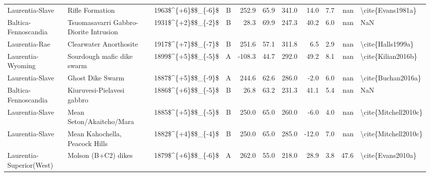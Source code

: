 \begin{longtable}{p{1 in}p{1 in}rrrrrrrr}
               Laurentia-Slave &                                    Rifle Formation &     1963\$\textasciicircum \{+6\}\$\$\_\{-6\}\$ &      B &     252.9 &      65.9 & 341.0 &  14.0 &       7.7 &         nan &                                  \textbackslash cite\{Evans1981a\} \\
          Baltica-Fennoscandia &             Tsuomasavarri Gabbro-Diorite Intrusion &     1931\$\textasciicircum \{+2\}\$\$\_\{-2\}\$ &      B &      28.3 &      69.9 & 247.3 &  40.2 &       6.0 &         nan &                                                NaN \\
                 Laurentia-Rae &                             Clearwater Anorthosite &     1917\$\textasciicircum \{+7\}\$\$\_\{-7\}\$ &      B &     251.6 &      57.1 & 311.8 &   6.5 &       2.9 &         nan &                                  \textbackslash cite\{Halls1999a\} \\
             Laurentia-Wyoming &                         Sourdough mafic dike swarm &     1899\$\textasciicircum \{+5\}\$\$\_\{-5\}\$ &      A &    -108.3 &      44.7 & 292.0 &  49.2 &       8.1 &         nan &                                 \textbackslash cite\{Kilian2016b\} \\
               Laurentia-Slave &                                   Ghost Dike Swarm &     1887\$\textasciicircum \{+5\}\$\$\_\{-9\}\$ &      A &     244.6 &      62.6 & 286.0 &  -2.0 &       6.0 &         nan &                                 \textbackslash cite\{Buchan2016a\} \\
          Baltica-Fennoscandia &                         Kiuruvesi-Pielavesi gabbro &     1886\$\textasciicircum \{+6\}\$\$\_\{-5\}\$ &      B &      26.8 &      63.2 & 231.3 &  41.1 &       5.4 &         nan &                                                NaN \\
               Laurentia-Slave &                           Mean Seton/Akaitcho/Mara &     1885\$\textasciicircum \{+5\}\$\$\_\{-5\}\$ &      B &     250.0 &      65.0 & 260.0 &  -6.0 &       4.0 &         nan &                               \textbackslash cite\{Mitchell2010c\} \\
               Laurentia-Slave &                     Mean Kahochella, Peacock Hills &     1882\$\textasciicircum \{+4\}\$\$\_\{-4\}\$ &      B &     250.0 &      65.0 & 285.0 & -12.0 &       7.0 &         nan &                               \textbackslash cite\{Mitchell2010c\} \\
      Laurentia-Superior(West) &                                Molson (B+C2) dikes &     1879\$\textasciicircum \{+6\}\$\$\_\{-6\}\$ &      A &     262.0 &      55.0 & 218.0 &  28.9 &       3.8 &        47.6 &                                  \textbackslash cite\{Evans2010a\} \\

\end{longtable}
